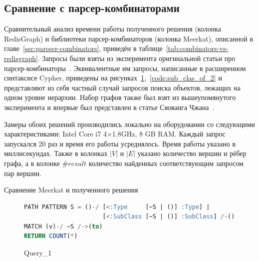 \subsection{Сравнение с парсер-комбинаторами}\label{sec:parse-comp-compare}
Сравнительный анализ времени работы полученного решения (колонка RedisGraph) и библиотеки парсер-комбинаторов (колонка Meer\-kat), описанной в главе~\ref{sec:pareser-combinators}, приведён в таблице~\ref{tab:combinators-vs-redisgraph}. Запросы были взяты из эксперимента оригинальной статьи про парсер-комбинаторы~\cite{parser-combinators}. Эквивалентные им запросы, написанные в расширенном синтаксисе Cyp\-her, приведены на рисунках~\ref{code:sub_clas_of_1},~\ref{code:sub_clas_of_2} и представляют из себя частный случай запросов поиска объектов, лежащих на одном уровне иерархии. Набор графов также был взят из вышеупомянутого эксперимента и впервые был представлен в статье Сяованга Чжана~\cite{zhlang-2016}.


Замеры обоих решений производились локально на оборудовании со следующими характеристиками: Intel Core i7 4$\times$1.8GHz, 8 GB RAM. Каждый запрос запускался 20 раз и время его работы усреднялось. Время работы указано в миллисекундах. Также в колонках $|V|$ и $|E|$ указано количество вершин и рёбер графа, а в колонке $\#result$ количество найденных соответствующим запросом пар вершин. 

\begin{table}[h!]
\begin{adjustbox}{max width=\textwidth}

\end{adjustbox}
\caption{Сравнение Meerkat и полученного решения}
\label{tab:combinators-vs-redisgraph}
\end{table}

\begin{figure}[h!]
\begin{adjustbox}{max width=\textwidth}
\begin{lstlisting}[language=sql]
PATH PATTERN S = ()-/ [<:Type     [~S | ()] :Type] | 
                      [<:SubClass [~S | ()] :SubClass] /-()
MATCH (v)-/ ~S /->(to)
RETURN COUNT(*)
\end{lstlisting}
\end{adjustbox}
\caption{Query\_1}
\label{code:sub_clas_of_1}
\end{figure}

